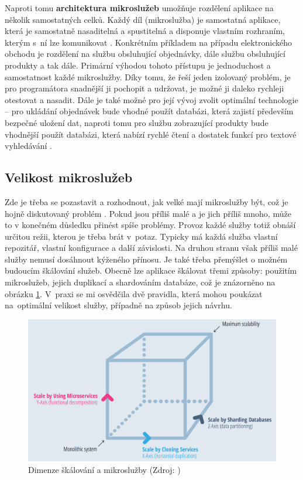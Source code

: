 \documentclass[FM,DP]{tulthesis}
\begin{document}
Naproti tomu \textbf{architektura mikroslužeb} umožňuje rozdělení aplikace na několik samostatných celků.
Každý díl (mikroslužba) je samostatná aplikace, která je samostatně nasaditelná a spustitelná a disponuje
vlastním rozhraním, kterým s~ní lze komunikovat \cite[strana~8]{microservices}. Konkrétním příkladem na případu
elektronického obchodu je rozdělení na službu obsluhující objednávky, dále službu obsluhující produkty a tak dále. 
Primární výhodou tohoto přístupu je jednoduchost a samostatnost každé mikroslužby. Díky tomu, že řeší jeden izolovaný 
problém, je pro programátora snadnější ji pochopit a udržovat, je možné ji daleko rychleji otestovat a nasadit. 
Dále je také možné pro její vývoj zvolit optimální technologie -- pro ukládání objednávek bude vhodné
použít databázi, která zajistí především bezpečné uložení dat, naproti tomu pro službu zobrazující produkty bude 
vhodnější použít databázi, která nabízí rychlé čtení a dostatek funkcí pro textové vyhledávání \cite[strana~83]{devops}.

\subsection{Velikost mikroslužeb}

Zde je třeba se pozastavit a rozhodnout, jak velké mají mikroslužby být, což je hojně diskutovaný problém 
\cite[strana~13]{microservices}. Pokud jsou příliš malé a je jich příliš mnoho, může to v konečném důsledku 
přinést spíše problémy. Provoz každé služby totiž obnáší určitou režii, kterou je třeba brát v~potaz. Typicky 
má každá služba vlastní repozitář, vlastní konfigurace a další závislosti. Na druhou stranu však příliš malé 
služby nemusí dosáhnout kýženého přínosu. Je také třeba přemýšlet o možném budoucím škálování služeb. Obecně 
lze aplikace škálovat třemi způsoby: použitím mikroslužeb, jejich duplikací a shardováním databáze, což je
znázorněno na obrázku \ref{microservices-scale}. V~praxi se mi osvědčila dvě pravidla, která mohou poukázat 
na~optimální velikost služby, případně na způsob jejich návrhu.

\begin{figure}[h]
\center
\includegraphics[width=\textwidth]{microservices-scale.png}
\caption{Dimenze škálování a mikroslužby (Zdroj: \cite[strana~10]{microservices})}
\label{microservices-scale}
\end{figure}
\end{document}
